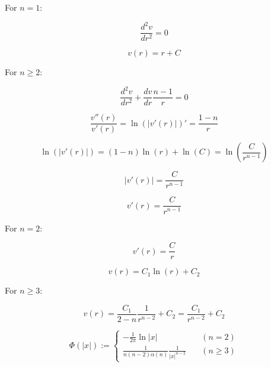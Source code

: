 \documentclass{article}
\begin{document}
For $n = 1$:

\begin{equation*}
    \frac{d^{2}v}{dr^{2}} = 0
\end{equation*}

\begin{equation*}
    v(r) = r + C
\end{equation*}

For $n \geq 2$:

\begin{equation*}
    \frac{d^{2}v}{dr^{2}} + \frac{dv}{dr}\frac{n-1}{r} = 0
\end{equation*}

\begin{equation*}
    \frac{v''(r)}{v'(r)} = \ln\left(\left| v'(r) \right|\right)' = \frac{1-n}{r}
\end{equation*}

\begin{equation*}
    \ln\left(\left| v'(r) \right|\right) = (1-n)\ln(r) + \ln(C) = \ln\left( \frac{C}{r^{n-1}} \right)
\end{equation*}

\begin{equation*}
    \left| v'(r) \right| = \frac{C}{r^{n-1}}
\end{equation*}

\begin{equation*}
    v'(r) = \frac{C}{r^{n-1}}
\end{equation*}

For $n = 2$:

\begin{equation*}
    v'(r) = \frac{C}{r}
\end{equation*}

\begin{equation*}
    v(r) = C_{1}\ln(r) + C_{2}
\end{equation*}

For $n \geq 3$:

\begin{equation*}
    v(r) = \frac{C_{1}}{2-n} \frac{1}{r^{n-2}} + C_{2} = \frac{C_{1}}{r^{n-2}} + C_{2}
\end{equation*}

\begin{definition}
    \begin{equation}
        \label{eq:laplace-equation-solution}
        \Phi(|x|) :=
        \begin{cases}
            -\frac{1}{2\pi}\ln|x| \quad                        & (n = 2)    \\
            \frac{1}{n(n-2)\alpha(n)}\frac{1}{|x|^{n-2}} \quad & (n \geq 3)
        \end{cases}
    \end{equation}
\end{definition}
\end{document}
